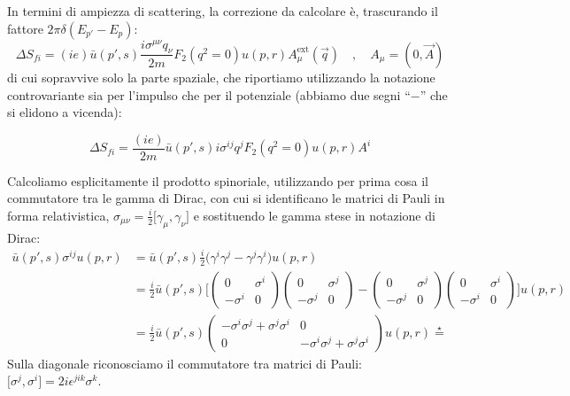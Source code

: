 \documentclass[../main.tex]{subfiles}
\begin{document}
In termini di ampiezza di scattering, la correzione da calcolare è, trascurando il fattore \(2\pi\delta(E_{p'}-E_p)\):
\[
{\Delta S_{fi} = (ie)\bar u(p',s) \frac{i\sigma^{\mu\nu}q_\nu}{2m}F_2(q^2=0) u(p,r)A_\mu^\text{ext}(\Vec{q})} \quad , \quad A_\mu = (0,\Vec{A})
\]
di cui sopravvive solo la parte spaziale, che riportiamo utilizzando la notazione controvariante sia per l'impulso che per il potenziale (abbiamo due segni “$-$” che si elidono a vicenda): 

\begin{equation}
    \boxed{\Delta S_{fi} = \frac{(ie)}{2m}\bar u(p',s) i\sigma^{ij}q^j F_2(q^2=0) u(p,r)A^i}
    \label{eq:Sficorrection_start}
\end{equation}

Calcoliamo esplicitamente il prodotto spinoriale, utilizzando per prima cosa il commutatore tra le gamma di Dirac, con cui si identificano le matrici di Pauli in forma relativistica, \(\sigma_{\mu\nu} = \frac{i}{2}\big[\gamma_\mu,\gamma_\nu\big] \) e sostituendo le gamma stese in notazione di Dirac:
\begin{align*}
    \bar u(p',s) \sigma^{ij} u(p,r) &= \bar u(p',s) \frac{i}{2}\big(\gamma^i\gamma^j-\gamma^j\gamma^i\big) u(p,r) \\
    & = \frac{i}{2}\bar u(p',s) 
    \Bigg[
    \begin{pmatrix}
                0   &   \sigma^i \\
        -\sigma^i   &   0
    \end{pmatrix}
    \begin{pmatrix}
                0   &   \sigma^j \\
        -\sigma^j   &   0
    \end{pmatrix}
    -
    \begin{pmatrix}
                0   &   \sigma^j \\
        -\sigma^j   &   0
    \end{pmatrix}
    \begin{pmatrix}
                0   &   \sigma^i \\
        -\sigma^i   &   0
    \end{pmatrix}
    \Bigg] u(p,r)\\
    & = \frac{i}{2}\bar u(p',s) 
    \begin{pmatrix}
        -\sigma^i\sigma^j +\sigma^j\sigma^i  &   0 \\
        0   &  -\sigma^i\sigma^j +\sigma^j\sigma^i
    \end{pmatrix}u(p,r) \overset{\star}{=}
\end{align*}
Sulla diagonale riconosciamo il commutatore tra matrici di Pauli: \(\big[\sigma^j,\sigma^i\big]=2i\epsilon^{jik}\sigma^k\).
\end{document}
